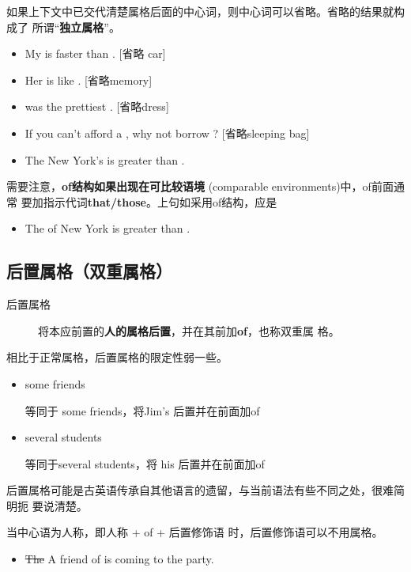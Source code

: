 如果上下文中已交代清楚属格后面的中心词，则中心词可以省略。省略的结果就构成了
所谓“\textbf{独立属格}”。
\begin{itemize}
\item  My  is faster than .  [省略 car]
\item  Her  is like . [省略memory]
\item {} was the prettiest . [省略dress]
\item If you can't afford a , why not borrow ? [省略sleeping bag]
\item The New York's  is greater than .
\end{itemize}

需要注意，\textbf{of结构如果出现在可比较语境} (comparable environments)中，of前面通常
要加指示代词\textbf{that/those}。上句如采用of结构，应是
\begin{itemize}
\item The  of New York is greater than .
\end{itemize}

\subsection{后置属格（双重属格）}

\begin{description}
\item[后置属格] 将本应前置的\textbf{人的属格后置}，并在其前加\textbf{of}，也称双重属
  格。
\end{description}

相比于正常属格，后置属格的限定性弱一些。
\begin{itemize}
\item some friends 

  等同于 some  friends，将Jim's 后置并在前面加of

\item several students 

  等同于several  students，将 his 后置并在前面加of
\end{itemize}

后置属格可能是古英语传承自其他语言的遗留，与当前语法有些不同之处，很难简明扼
要说清楚。

当中心语为人称，即人称 + of + 后置修饰语 时，后置修饰语可以不用属格。
\begin{itemize}
\item \sout{The} A friend of  is coming to the party.
\end{itemize}

